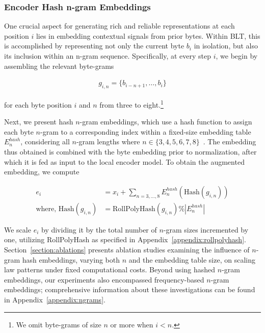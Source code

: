 \subsubsection{Encoder Hash n-gram Embeddings}
\label{sec:ngram-emb}
\label{sec:hash-emb}
One crucial aspect for generating rich and reliable representations at each position $i$ lies in embedding contextual signals from prior bytes. Within {\textsc BLT}, this is accomplished by representing not only the current byte $b_i$ in isolation, but also its inclusion within an n-gram sequence. Specifically, at every step $i$, we begin by assembling the relevant byte-grams

\begin{align}
    g_{i,n}=\{b_{i-n + 1},\ldots, b_i\}
\end{align}

for each byte position $i$ and $n$ from three to eight.\footnote{
We omit byte-grams of size $n$ or more when $i<n$. }

Next, we present hash $n$-gram embeddings, which use a hash function to assign each byte $n$-gram to a corresponding index within a fixed-size embedding table $E_{n}^{hash}$, considering all $n$-gram lengths where $n \in\{3,4,5,6,7,8\}$~\citep{bai2010learning}. The embedding thus obtained is combined with the byte embedding prior to normalization, after which it is fed as input to the local encoder model. To obtain the augmented embedding, we compute

\begin{align}
e_i &= x_i + \sum_{n = 3,...,8}E_{n}^{hash}(\text{Hash}(g_{i,n})) \\
\text{where, Hash}(g_{i,n}) &= \text{RollPolyHash}(g_{i,n}) \% |E_{n}^{hash}|
\end{align}

We scale $e_i$ by dividing it by the total number of $n$-gram sizes incremented by one, utilizing RollPolyHash as specified in Appendix~\ref{appendix:rollpolyhash}. Section~\ref{section:ablations} presents ablation studies examining the influence of $n$-gram hash embeddings, varying both $n$ and the embedding table size, on scaling law patterns under fixed computational costs. Beyond using hashed $n$-gram embeddings, our experiments also encompassed frequency-based $n$-gram embeddings; comprehensive information about these investigations can be found in Appendix~\ref{appendix:ngrams}.

